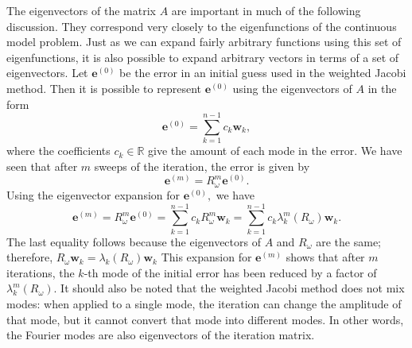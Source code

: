 \documentclass[letterpaper,12pt]{article}
\begin{document}
The eigenvectors of the matrix $A$ are important in much of the following discussion. They correspond very closely to the eigenfunctions of the continuous model problem. Just as we can expand fairly arbitrary functions using this set of eigenfunctions, it is also possible to expand arbitrary vectors in terms of a set of eigenvectors. Let $\mathbf{e}^{(0)}$ be the error in an initial guess used in the weighted Jacobi method. Then it is possible to represent $\mathbf{e}^{(0)}$ using the eigenvectors of $A$ in the form
\begin{equation}
\mathbf{e}^{(0)}=\sum_{k=1}^{n-1} c_{k} \mathbf{w}_{k},
\end{equation}
where the coefficients $c_{k} \in \mathbb{R}$ give the amount of each mode in the error. We have seen that after $m$ sweeps of the iteration, the error is given by
\begin{equation}
\mathbf{e}^{(m)}=R_{\omega}^{m} \mathbf{e}^{(0)}.
\end{equation}
Using the eigenvector expansion for $\mathbf{e}^{(0)},$ we have
\begin{equation}
\mathbf{e}^{(m)}=R_{\omega}^{m} \mathbf{e}^{(0)}=\sum_{k=1}^{n-1} c_{k} R_{\omega}^{m} \mathbf{w}_{k}=\sum_{k=1}^{n-1} c_{k} \lambda_{k}^{m}\left(R_{\omega}\right) \mathbf{w}_{k}.\label{eq:error_analysis}
\end{equation}
The last equality follows because the eigenvectors of $A$ and $R_{\omega}$ are the same; therefore, $R_{\omega} \mathbf{w}_{k}=\lambda_{k}\left(R_{\omega}\right) \mathbf{w}_{k}$
This expansion for $\mathbf{e}^{(m)}$ shows that after $m$ iterations, the $k$-th mode of the initial error has been reduced by a factor of $\lambda_{k}^{m}\left(R_{\omega}\right).$ It should also be noted that the weighted Jacobi method does not mix modes: when applied to a single mode, the iteration can change the amplitude of that mode, but it cannot convert that mode into different modes. In other words, the Fourier modes are also eigenvectors of the iteration matrix. 
\end{document}
